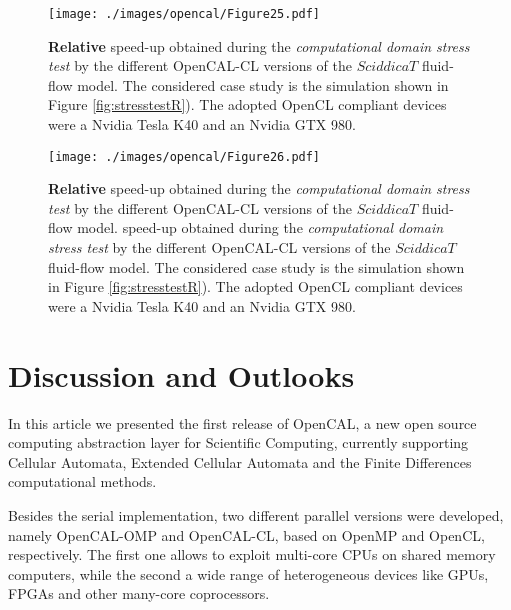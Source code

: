 \begin{figure}
	\begin{center}
		\texttt{[image: ./images/opencal/Figure25.pdf]}
		\caption[\textbf{Relative} speed-up obtained during the \emph{computational domain
			stress test} by the different OpenCAL-CL versions of the $SciddicaT$
		fluid-flow model.]{\textbf{Relative} speed-up obtained during the \emph{computational domain
				stress test} by the different OpenCAL-CL versions of the $SciddicaT$
			fluid-flow model. The considered case study is the simulation shown in
			Figure \ref{fig:stresstestR}). The adopted OpenCL compliant devices
			were a Nvidia Tesla K40 and an Nvidia GTX 980.}
		\label{gr:sciddicaT-CL-relative-speed-up-stressR}
	\end{center}
\end{figure}

\begin{figure}
	\begin{center}
		\texttt{[image: ./images/opencal/Figure26.pdf]}
		\caption[\textbf{Relative} speed-up obtained during the \emph{computational domain
			stress test} by the different OpenCAL-CL versions of the $SciddicaT$
		fluid-flow model.]{\textbf{Relative} speed-up obtained during the \emph{computational domain
				stress test} by the different OpenCAL-CL versions of the $SciddicaT$
			fluid-flow model. speed-up obtained during the \emph{computational domain
				stress test} by the different OpenCAL-CL versions of the $SciddicaT$
			fluid-flow model. The considered case study is the simulation shown in
			Figure \ref{fig:stresstestR}). The adopted OpenCL compliant devices
			were a Nvidia Tesla K40 and an Nvidia GTX 980.}
		\label{gr:sciddicaT-CL-absolute-speed-up-stressR}
	\end{center}
\end{figure}

\section{Discussion and Outlooks}

In this article we presented the first release of OpenCAL, a new
open source computing abstraction layer for Scientific Computing,
currently supporting Cellular Automata, Extended Cellular Automata
and the Finite Differences computational methods.

Besides the serial implementation, two different parallel versions
were developed, namely OpenCAL-OMP and OpenCAL-CL, based on OpenMP
and OpenCL, respectively. The first one allows to exploit multi-core
CPUs on shared memory computers, while the second a wide range of
heterogeneous devices like GPUs, FPGAs and other many-core
coprocessors.

